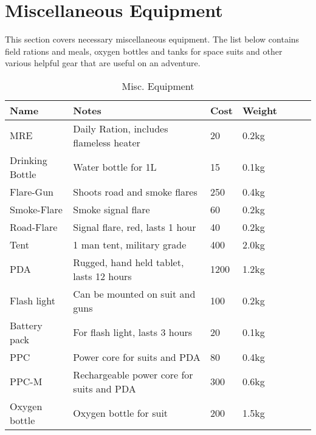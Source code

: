 \section{Miscellaneous Equipment}
\label{sec:9-Miscellanous Equipment}

This section covers necessary miscellaneous equipment. The list below contains
field rations and meals, oxygen bottles and tanks for space suits and other
various helpful gear that are useful on an adventure.

\begin{table}
  \caption{Misc. Equipment}
  \label{tab:MiscEquipment}
  \begin{center}
    \begin{tabular}{| l | l | l | l | l | l | l |}

      \hline
      \textbf{Name} & \textbf{Notes} & \textbf{Cost} & \textbf{Weight} \\ \hline

      MRE             & Daily Ration, includes flameless heater  &   20 & 0.2kg \\ \hline
      Drinking Bottle & Water bottle for 1L                      &   15 & 0.1kg \\ \hline

      Flare-Gun       & Shoots road and smoke flares             &  250 & 0.4kg \\ \hline
      Smoke-Flare     & Smoke signal flare                       &   60 & 0.2kg \\ \hline
      Road-Flare      & Signal flare, red, lasts 1 hour          &   40 & 0.2kg \\ \hline

      Tent            & 1 man tent, military grade               &  400 & 2.0kg \\ \hline

      PDA             & Rugged, hand held tablet, lasts 12 hours & 1200 & 1.2kg \\ \hline

      Flash light     & Can be mounted on suit and guns          &  100 & 0.2kg \\ \hline

      Battery pack    & For flash light, lasts 3 hours           &   20 & 0.1kg \\ \hline
      PPC             & Power core for suits and PDA             &   80 & 0.4kg \\ \hline
      PPC-M           & Rechargeable power core for suits and PDA & 300 & 0.6kg \\ \hline
      Oxygen bottle   & Oxygen bottle for suit                   &  200 & 1.5kg \\ \hline

    \end{tabular}
  \end{center}
\end{table}
